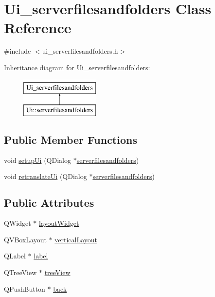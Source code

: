 \hypertarget{classUi__serverfilesandfolders}{\section{Ui\-\_\-serverfilesandfolders Class Reference}
\label{classUi__serverfilesandfolders}
}


{\ttfamily \#include $<$ui\-\_\-serverfilesandfolders.\-h$>$}

Inheritance diagram for Ui\-\_\-serverfilesandfolders\-:\begin{figure}[H]
\begin{center}
\leavevmode
\includegraphics[height=2.000000cm]{classUi__serverfilesandfolders}
\end{center}
\end{figure}
\subsection*{Public Member Functions}
\begin{DoxyCompactItemize}
\item 
void \hyperlink{classUi__serverfilesandfolders_a76af20f8cb4f7ab2eb3ea3ba7ad2c7a6}{setup\-Ui} (Q\-Dialog $\ast$\hyperlink{classserverfilesandfolders}{serverfilesandfolders})
\item 
void \hyperlink{classUi__serverfilesandfolders_aa69fcaab2df41f505801a902f2f951ee}{retranslate\-Ui} (Q\-Dialog $\ast$\hyperlink{classserverfilesandfolders}{serverfilesandfolders})
\end{DoxyCompactItemize}
\subsection*{Public Attributes}
\begin{DoxyCompactItemize}
\item 
Q\-Widget $\ast$ \hyperlink{classUi__serverfilesandfolders_a47a10c1749cf75c7fb9c3aaeea53494e}{layout\-Widget}
\item 
Q\-V\-Box\-Layout $\ast$ \hyperlink{classUi__serverfilesandfolders_a29cf8c53fe60d27322921fde2a072f65}{vertical\-Layout}
\item 
Q\-Label $\ast$ \hyperlink{classUi__serverfilesandfolders_a9c02cefd8fed0f107977e36eb7511b4c}{label}
\item 
Q\-Tree\-View $\ast$ \hyperlink{classUi__serverfilesandfolders_a5e983a9840e30bc26a8b7f0640833c93}{tree\-View}
\item 
Q\-Push\-Button $\ast$ \hyperlink{classUi__serverfilesandfolders_a942d6d5883f0875665471278d70ffee7}{back}
\end{DoxyCompactItemize}


